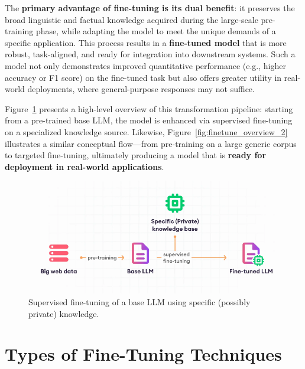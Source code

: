 \vspace{0.5cm}

The \textbf{primary advantage of fine-tuning is its dual benefit}: it preserves the broad linguistic and factual knowledge acquired during the large-scale pre-training phase, while adapting the model to meet the unique demands of a specific application. This process results in a \textbf{fine-tuned model} that is more robust, task-aligned, and ready for integration into downstream systems. Such a model not only demonstrates improved quantitative performance (e.g., higher accuracy or F1 score) on the fine-tuned task but also offers greater utility in real-world deployments, where general-purpose responses may not suffice.

\vspace{0.5cm}

Figure~\ref{fig:finetune_overview_1} presents a high-level overview of this transformation pipeline: starting from a pre-trained base LLM, the model is enhanced via supervised fine-tuning on a specialized knowledge source. Likewise, Figure~\ref{fig:finetune_overview_2} illustrates a similar conceptual flow—from pre-training on a large generic corpus to targeted fine-tuning, ultimately producing a model that is \textbf{ready for deployment in real-world applications}.

\vspace{1cm}

\begin{figure}[H]
    \centering
    \includegraphics[width=0.85\linewidth]{img/chap05/5.1.1.png}
    \caption{Supervised fine-tuning of a base LLM using specific (possibly private) knowledge.}
    \label{fig:finetune_overview_1}
\end{figure}



\section{Types of Fine-Tuning Techniques}

